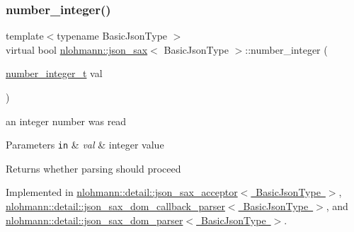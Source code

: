 \mbox{\label{structnlohmann_1_1json__sax_affa7a78b8e9cc9cc3ac99927143142a5}} 
\subsubsection{\texorpdfstring{number\+\_\+integer()}{number\_integer()}}
{\footnotesize\ttfamily template$<$typename Basic\+Json\+Type $>$ \\
virtual bool \mbox{\hyperlink{structnlohmann_1_1json__sax}{nlohmann\+::json\+\_\+sax}}$<$ Basic\+Json\+Type $>$\+::number\+\_\+integer (\begin{DoxyParamCaption}\item[{\mbox{\hyperlink{structnlohmann_1_1json__sax_a0cef30121f02b7fee85e9708148ea0aa}{number\+\_\+integer\+\_\+t}}}]{val }\end{DoxyParamCaption})\hspace{0.3cm}{\ttfamily [pure virtual]}}



an integer number was read 


\begin{DoxyParams}[1]{Parameters}
\mbox{\tt in}  & {\em val} & integer value \\
\hline
\end{DoxyParams}
\begin{DoxyReturn}{Returns}
whether parsing should proceed 
\end{DoxyReturn}


Implemented in \mbox{\hyperlink{classnlohmann_1_1detail_1_1json__sax__acceptor_ab74d476d1540851afc690aff28301cac}{nlohmann\+::detail\+::json\+\_\+sax\+\_\+acceptor$<$ Basic\+Json\+Type $>$}}, \mbox{\hyperlink{classnlohmann_1_1detail_1_1json__sax__dom__callback__parser_ad9a642701515c3cd85e6d72f9fa117c9}{nlohmann\+::detail\+::json\+\_\+sax\+\_\+dom\+\_\+callback\+\_\+parser$<$ Basic\+Json\+Type $>$}}, and \mbox{\hyperlink{classnlohmann_1_1detail_1_1json__sax__dom__parser_a835f34811b941c9d9d90b8960b50ed36}{nlohmann\+::detail\+::json\+\_\+sax\+\_\+dom\+\_\+parser$<$ Basic\+Json\+Type $>$}}.

\mbox{\label{structnlohmann_1_1json__sax_ad9b253083e0509923ba195136f49face}} 

